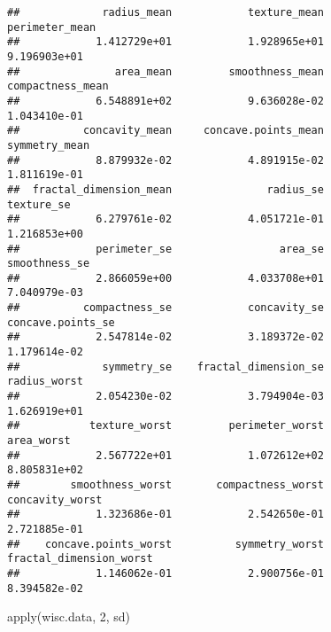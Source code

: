\documentclass[
]{article}
\newenvironment{Shaded}{\begin{snugshade}}{\end{snugshade}}
\newcommand{\DecValTok}[1]{\textcolor[rgb]{0.00,0.00,0.81}{#1}}
\newcommand{\FunctionTok}[1]{\textcolor[rgb]{0.00,0.00,0.00}{#1}}
\newcommand{\NormalTok}[1]{#1}
\begin{document}
\begin{verbatim}
##             radius_mean            texture_mean          perimeter_mean 
##            1.412729e+01            1.928965e+01            9.196903e+01 
##               area_mean         smoothness_mean        compactness_mean 
##            6.548891e+02            9.636028e-02            1.043410e-01 
##          concavity_mean     concave.points_mean           symmetry_mean 
##            8.879932e-02            4.891915e-02            1.811619e-01 
##  fractal_dimension_mean               radius_se              texture_se 
##            6.279761e-02            4.051721e-01            1.216853e+00 
##            perimeter_se                 area_se           smoothness_se 
##            2.866059e+00            4.033708e+01            7.040979e-03 
##          compactness_se            concavity_se       concave.points_se 
##            2.547814e-02            3.189372e-02            1.179614e-02 
##             symmetry_se    fractal_dimension_se            radius_worst 
##            2.054230e-02            3.794904e-03            1.626919e+01 
##           texture_worst         perimeter_worst              area_worst 
##            2.567722e+01            1.072612e+02            8.805831e+02 
##        smoothness_worst       compactness_worst         concavity_worst 
##            1.323686e-01            2.542650e-01            2.721885e-01 
##    concave.points_worst          symmetry_worst fractal_dimension_worst 
##            1.146062e-01            2.900756e-01            8.394582e-02
\end{verbatim}

\begin{Shaded}
\begin{Highlighting}[]
\FunctionTok{apply}\NormalTok{(wisc.data, }\DecValTok{2}\NormalTok{, sd)}
\end{Highlighting}
\end{Shaded}
\end{document}
